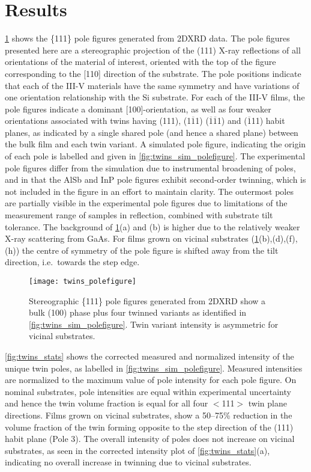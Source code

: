 \section{Results}
\cref{fig:twins_polefigure} shows the \{111\} pole figures generated from 2DXRD data. The pole figures presented here are a stereographic projection of the (111) X-ray reflections of all orientations of the material of interest, oriented with the top of the figure corresponding to the [110] direction of the substrate. The pole positions indicate that each of the III-V materials have the same symmetry and have variations of one orientation relationship with the Si substrate. For each of the III-V films, the pole figures indicate a dominant [100]-orientation, as well as four weaker orientations associated with twins having (111), (1$\overline{1}$1) ($\overline{1}\overline{1}$1) and ($\overline{1}$11) habit planes, as indicated by a single shared pole (and hence a shared plane) between the bulk film and each twin variant. A simulated pole figure, indicating the origin of each pole is labelled and given in \cref{fig:twins_sim_polefigure}. The experimental pole figures differ from the simulation due to instrumental broadening of poles, and in that the AlSb and InP pole figures exhibit second-order twinning, which is not included in the figure in an effort to maintain clarity. The outermost poles are partially visible in the experimental pole figures due to limitations of the measurement range of samples in reflection, combined with substrate tilt tolerance. The background of \cref{fig:twins_polefigure}(a) and (b) is higher due to the relatively weaker X-ray scattering from GaAs. For films grown on vicinal substrates (\cref{fig:twins_polefigure}(b),(d),(f),(h)) the centre of symmetry of the pole figure is shifted away from the tilt direction, i.e.\ towards the step edge.
\begin{figure}
    \centering
    \texttt{[image: twins\_polefigure]}
    \caption[Pole figures of nominal and vicinal substrates]{\label{fig:twins_polefigure}Stereographic \{111\} pole figures generated from 2DXRD show a bulk (100) phase plus four twinned variants as identified in \cref{fig:twins_sim_polefigure}. Twin variant intensity is asymmetric for vicinal substrates.}
\end{figure}
\cref{fig:twins_stats} shows the corrected measured and normalized intensity of the unique twin poles, as labelled in \cref{fig:twins_sim_polefigure}. Measured intensities are normalized to the maximum value of pole intensity for each pole figure. On nominal substrates, pole intensities are equal within experimental uncertainty and hence the twin volume fraction is equal for all four $<$111$>$ twin plane directions. Films grown on vicinal substrates, show a 50--75\% reduction in the volume fraction of the twin forming opposite to the step direction of the (111) habit plane (Pole 3). The overall intensity of poles does not increase on vicinal substrates, as seen in the corrected intensity plot of \cref{fig:twins_stats}(a), indicating no overall increase in twinning due to vicinal substrates.
